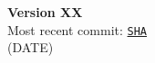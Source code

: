 \begin{center}{
    {\large\bf Version XX}\\
    Most recent commit: \href{URL}{\texttt{SHA}}\\
    (DATE)}\\
\end{center}
